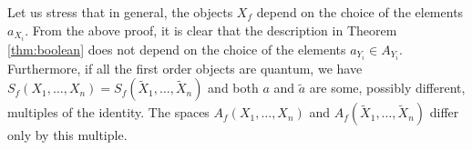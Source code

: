 \documentclass[12pt]{article}
\newtheorem{prop}{Proposition}
\theoremstyle{definition}
\theoremstyle{remark}
\def\Te{\mathcal T}
\def\Fe{\mathcal F}
\begin{document}
Let us stress that in general, the objects $X_f$ depend on the choice of the elements
$a_{X_i}$. From the above proof, it is clear that  the  description in Theorem
\ref{thm:boolean} does not depend on the choice of the elements $a_{Y_i}\in A_{Y_i}$.
Furthermore, if all the first order objects are quantum, we have
$S_f(X_1,\dots,X_n)=S_f(\tilde X_1,\dots,\tilde X_n)$ and both $a$ and $\tilde a$ are 
some, possibly different,  multiples of the identity. The spaces $A_f(X_1,\dots,X_n)$ and $A_f(\tilde X_1,\dots,\tilde
X_n)$ differ only by this multiple. 

%
%
%
%
%
%
%
%
%
%
\end{document}

